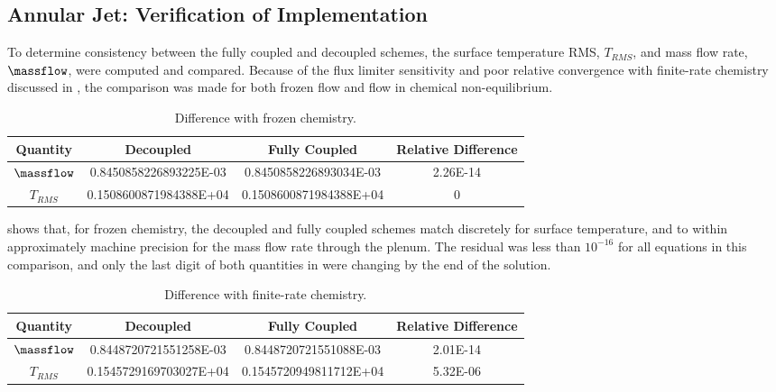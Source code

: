 \subsection{Annular Jet: Verification of Implementation}
\label{sec:annular-jet-flow-verify}

To determine consistency between the fully coupled and decoupled schemes, the
surface temperature RMS, $T_{RMS}$, and mass flow rate, $\massflow$, were
computed and compared.  Because of the flux limiter sensitivity and poor
relative convergence with finite-rate chemistry discussed in
, the comparison was made for both frozen flow and
flow in chemical non-equilibrium.
\begin{table}
  \centering
  \begin{tabular}{c|c|c|c}
    Quantity & Decoupled & Fully Coupled & Relative Difference \\
    \hline
    $\massflow$ & 0.8450858226893225E-03 & 0.8450858226893034E-03 & 2.26E-14 \\
    $T_{RMS}$   & 0.1508600871984388E+04 & 0.1508600871984388E+04 & 0
  \end{tabular}
  \caption{Difference with frozen chemistry.}
  \label{tab:srp-frozen-flow-diff}
\end{table}
 shows that, for frozen chemistry, the decoupled
and fully coupled schemes match discretely for surface temperature, and to
within approximately machine precision for the mass flow rate through the
plenum.  The residual was less than $10^{-16}$ for all equations in this
comparison, and only the last digit of both quantities in
 were changing by the end of the solution.
\begin{table}
  \centering
  \begin{tabular}{c|c|c|c}
    Quantity & Decoupled & Fully Coupled & Relative Difference \\
    \hline
    $\massflow$ & 0.8448720721551258E-03 & 0.8448720721551088E-03 & 2.01E-14 \\
    $T_{RMS}$   & 0.1545729169703027E+04 & 0.1545720949811712E+04 & 5.32E-06
  \end{tabular}
  \caption{Difference with finite-rate chemistry.}
  \label{tab:srp-chem-flow-diff}
\end{table}
